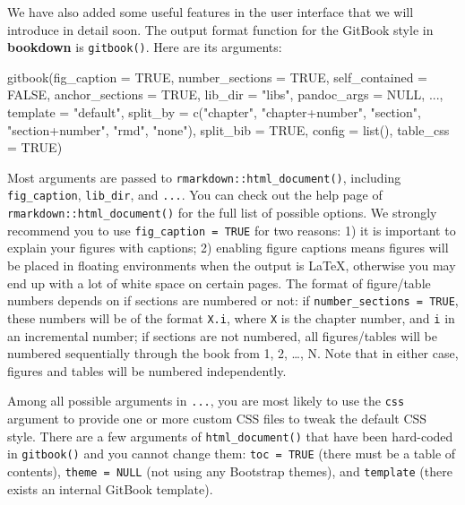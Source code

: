 \documentclass[
  12pt,
]{krantz}
\newenvironment{Shaded}{\begin{snugshade}}{\end{snugshade}}
\newcommand{\AttributeTok}[1]{\textcolor[rgb]{0.77,0.63,0.00}{#1}}
\newcommand{\ConstantTok}[1]{\textcolor[rgb]{0.00,0.00,0.00}{#1}}
\newcommand{\FunctionTok}[1]{\textcolor[rgb]{0.00,0.00,0.00}{#1}}
\newcommand{\NormalTok}[1]{#1}
\newcommand{\StringTok}[1]{\textcolor[rgb]{0.31,0.60,0.02}{#1}}
\theoremstyle{definition}
\theoremstyle{definition}
\theoremstyle{definition}
\theoremstyle{definition}
\theoremstyle{remark}
\begin{document}
We have also added some useful features in the user interface that we will introduce in detail soon. The output format function for the GitBook style in \textbf{bookdown} is \texttt{gitbook()}. Here are its arguments:

\begin{Shaded}
\begin{Highlighting}[]
\FunctionTok{gitbook}\NormalTok{(}\AttributeTok{fig\_caption =} \ConstantTok{TRUE}\NormalTok{, }\AttributeTok{number\_sections =} \ConstantTok{TRUE}\NormalTok{,}
  \AttributeTok{self\_contained =} \ConstantTok{FALSE}\NormalTok{, }\AttributeTok{anchor\_sections =} \ConstantTok{TRUE}\NormalTok{,}
  \AttributeTok{lib\_dir =} \StringTok{"libs"}\NormalTok{, }\AttributeTok{pandoc\_args =} \ConstantTok{NULL}\NormalTok{, ...,}
  \AttributeTok{template =} \StringTok{"default"}\NormalTok{,}
  \AttributeTok{split\_by =} \FunctionTok{c}\NormalTok{(}\StringTok{"chapter"}\NormalTok{, }\StringTok{"chapter+number"}\NormalTok{, }\StringTok{"section"}\NormalTok{, }\StringTok{"section+number"}\NormalTok{, }\StringTok{"rmd"}\NormalTok{, }\StringTok{"none"}\NormalTok{),}
  \AttributeTok{split\_bib =} \ConstantTok{TRUE}\NormalTok{, }\AttributeTok{config =} \FunctionTok{list}\NormalTok{(), }\AttributeTok{table\_css =} \ConstantTok{TRUE}\NormalTok{)}
\end{Highlighting}
\end{Shaded}

Most arguments are passed to \texttt{rmarkdown::html\_document()}, including \texttt{fig\_caption}, \texttt{lib\_dir}, and \texttt{...}. You can check out the help page of \texttt{rmarkdown::html\_document()} for the full list of possible options. We strongly recommend you to use \texttt{fig\_caption\ =\ TRUE} for two reasons: 1) it is important to explain your figures with captions; 2) enabling figure captions means figures will be placed in floating environments when the output is LaTeX, otherwise you may end up with a lot of white space on certain pages. The format of figure/table numbers depends on if sections are numbered or not: if \texttt{number\_sections\ =\ TRUE}, these numbers will be of the format \texttt{X.i}, where \texttt{X} is the chapter number, and \texttt{i} in an incremental number; if sections are not numbered, all figures/tables will be numbered sequentially through the book from 1, 2, \ldots, N. Note that in either case, figures and tables will be numbered independently.

Among all possible arguments in \texttt{...}, you are most likely to use the \texttt{css} argument to provide one or more custom CSS files to tweak the default CSS style. There are a few arguments of \texttt{html\_document()} that have been hard-coded in \texttt{gitbook()} and you cannot change them: \texttt{toc\ =\ TRUE} (there must be a table of contents), \texttt{theme\ =\ NULL} (not using any Bootstrap themes), and \texttt{template} (there exists an internal GitBook template).
\end{document}

